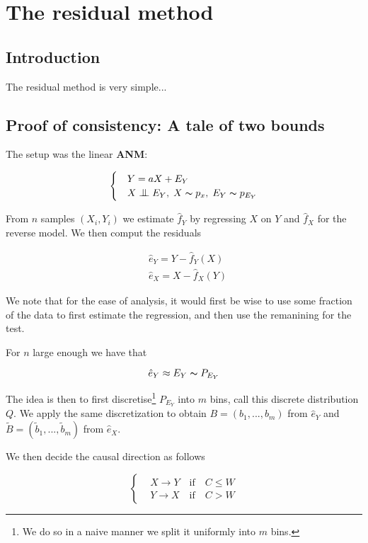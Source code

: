 \newpage
\section{The residual method}

\subsection{Introduction}

The residual method is very simple...


\subsection{Proof of consistency: A tale of two bounds}

The setup was the linear \textbf{ANM}:

\[ \begin{cases} 
    & Y = aX + E_Y  \\
    & X \bigCI E_Y,\; X \thicksim p_x,\; E_Y \thicksim p_{E_Y}  
 \end{cases}
\]

From $n$ samples $(X_i, Y_i)$ we estimate $\hat{f}_Y$ by regressing $X$ on $Y$ and 
$\hat{f}_X$ for the reverse model. We then comput the residuals

\begin{align}
    &  \hat{e}_Y = Y - \hat{f}_Y(X)\\
    &  \hat{e}_X = X - \hat{f}_X(Y)
\end{align}

We note that for the ease of analysis, it would first be wise to use some fraction 
of the data to first estimate the regression, and then use the remanining for the test.

For $n$ large enough we have that 

$$
    \hat{e}_Y \approx E_Y \thicksim P_{E_Y}
$$

The idea is then to first discretise\footnote{We do so in a naive manner we split
it uniformly into $m$ bins.} $P_{E_Y}$ into $m$ bins, call this discrete distribution
$Q$. We apply the same discretization to obtain $B = (b_1, ..., b_m)$ from $\hat{e}_Y$
and $\tilde{B} = (\tilde{b}_1, ..., \tilde{b}_m)$ from $\hat{e}_X$.

We then decide the causal direction as follows

\[ \begin{cases} 
    & X \rightarrow Y \quad \text{if} \quad C \leq W  \\
    & Y \rightarrow X \quad \text{if} \quad C > W  
 \end{cases}
\]

